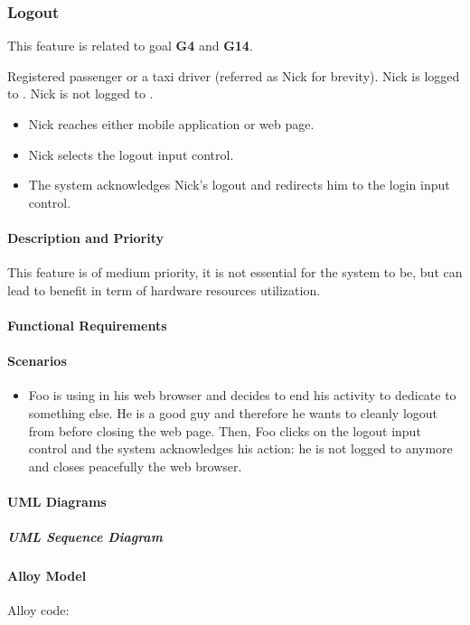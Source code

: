 \subsubsection{Logout}
This feature is related to goal \textbf{G4} and \textbf{G14}.
\begin{itemize}
	 Registered passenger or a taxi driver (referred as Nick for brevity).
	 Nick is logged to \myTaxiService{}.
	 Nick is not logged to \myTaxiService{}.
	\begin{itemize}
		\item Nick reaches either \myTaxiService{} mobile application or web page.
		\item Nick selects the logout input control.
		\item The system acknowledges Nick's logout and redirects him to the login input control.
	\end{itemize}
\end{itemize}
\paragraph{Description and Priority}
This feature is of medium priority, it is not essential for the system to be, but can lead to benefit in term of hardware resources utilization.\par
\paragraph{Functional Requirements}
\begin{itemize}
\end{itemize}
\paragraph{Scenarios}
\begin{itemize}
	\item Foo is using \myTaxiService{} in his web browser and decides to end his activity to dedicate to something else.
	He is a good guy and therefore he wants to cleanly logout from \myTaxiService{} before closing the web page.
	Then, Foo clicks on the logout input control and the system acknowledges his action: he is not logged to \myTaxiService{} anymore and closes peacefully the web browser.
\end{itemize}
\paragraph{UML Diagrams}
\subparagraph{UML Sequence Diagram}
\paragraph{Alloy Model}
Alloy code: